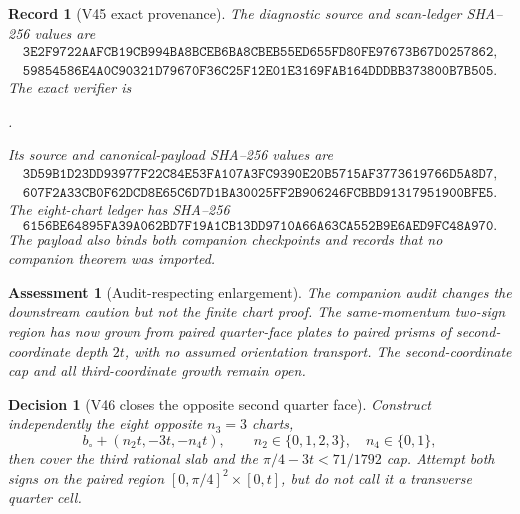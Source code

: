 \documentclass[11pt,oneside]{article}
\newtheorem{assessment}[theorem]{Assessment}
\newtheorem{record}[theorem]{Record}
\newtheorem{decision}[theorem]{Decision}
\theoremstyle{definition}
\theoremstyle{remark}
\begin{document}
\begin{record}[V45 exact provenance]
\label{rec:newv45-provenance}
The diagnostic source and scan-ledger SHA--256 values are
\[
\begin{gathered}
\texttt{3E2F9722AAFCB19CB994BA8BCEB6BA8CBEB55ED655FD80FE97673B67D0257862},\\
\texttt{59854586E4A0C90321D79670F36C25F12E01E3169FAB164DDDBB373800B7B505}.
\end{gathered}                                         \tag{45.13}
\]
The exact verifier is
\begin{center}
\footnotesize
{}.
\end{center}
Its source and canonical-payload SHA--256 values are
\[
\begin{gathered}
\texttt{3D59B1D23DD93977F22C84E53FA107A3FC9390E20B5715AF3773619766D5A8D7},\\
\texttt{607F2A33CB0F62DCD8E65C6D7D1BA30025FF2B906246FCBBD91317951900BFE5}.
\end{gathered}                                         \tag{45.14}
\]
The eight-chart ledger has SHA--256
\[
\texttt{6156BE64895FA39A062BD7F19A1CB13DD9710A66A63CA552B9E6AED9FC48A970}.
                                                               \tag{45.15}
\]
The payload also binds both companion checkpoints and records that
no companion theorem was imported.
\end{record}

\begin{assessment}[Audit-respecting enlargement]
\label{ass:newv45}
The companion audit changes the downstream caution but not the
finite chart proof.  The same-momentum two-sign region has now
grown from paired quarter-face plates to paired prisms of
second-coordinate depth \(2t\), with no assumed orientation
transport.  The second-coordinate cap and all third-coordinate
growth remain open.
\end{assessment}

\begin{decision}[V46 closes the opposite second quarter face]
\label{dec:newv45-next}
Construct independently the eight opposite \(n_3=3\) charts,
\[
 b_\circ+(n_2t,-3t,-n_4t),
 \qquad n_2\in\{0,1,2,3\},\quad n_4\in\{0,1\},         \tag{45.16}
\]
then cover the third rational slab and the
\(\pi/4-3t<71/1792\) cap.  Attempt both signs on the paired region
\([0,\pi/4]^2\times[0,t]\), but do not call it a transverse
quarter cell.
\end{decision}
\end{document}
